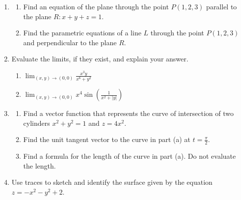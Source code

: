 \documentclass[a4paper, 12pt]{article}
\renewcommand{\headrulewidth}{0pt}
\begin{document}
\begin{enumerate}[leftmargin=*,label=\textbf{\arabic*.}]
\begin{enumerate}[leftmargin=*,label=\textbf{\alph*.}]
\end{enumerate}

\item \begin{enumerate}[leftmargin=*,label=\textbf{\alph*.}]
\item Find an equation of the plane through the point $P(1,2,3)$ parallel to the plane $R: x+y+z=1$.
\item Find the parametric equations of a line $L$ through the point $P(1,2,3)$ and perpendicular to the plane $R$.
\end{enumerate}

\item Evaluate the limits, if they exist, and explain your answer.

\begin{enumerate}[leftmargin=*,label=\textbf{\alph*.}]
\item $\displaystyle\lim_{(x,y)\to(0,0)}\frac{x^3y}{x^6+y^2}$ 
\item $\displaystyle\lim_{(x,y)\to(0,0)}x^4\sin\left(\frac1{x^2+\left|y\right|}\right)$ \ \ \ 
\end{enumerate}

\item \begin{enumerate}[leftmargin=*,label=\textbf{\alph*.}]
\item Find a vector function that represents the curve of intersection of two cylinders $x^2+y^2=1$ and $z=4x^2$.
\item Find the unit tangent vector to the curve in part (a) at $\displaystyle t=\frac\pi2$.
\item Find a formula for the length of the curve in part (a). Do not evaluate the length.
\end{enumerate}

\item Use traces to sketch and identify the surface given by the equation $z=-x^2-y^2+2$.
\end{enumerate}

\newpage
\pagestyle{fancy}
\renewcommand{\headrulewidth}{1pt}

\end{document}
